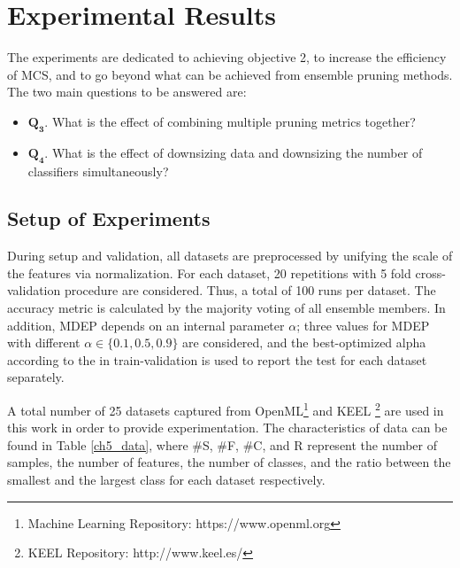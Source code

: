 %
%
\section{Experimental Results}
\label{ch5_expsetup}
The experiments are dedicated to achieving objective 2, to increase the efficiency of MCS, and to go beyond what can be achieved from ensemble pruning methods. The two main questions to be answered are:
\begin{itemize}[nosep]
\setlength{\itemindent}{-.5in}
    \item $\pmb{Q_3}$. What is the effect of combining multiple pruning metrics together? 
    \item $\pmb{Q_4}$. What is the effect of downsizing data and downsizing the number of classifiers simultaneously? 
\end{itemize}

\subsection{Setup of Experiments}
During setup and validation, all datasets are preprocessed by unifying the scale of the features via normalization. For each dataset, 20 repetitions with 5 fold cross-validation procedure are considered. Thus, a total of 100 runs per dataset. The accuracy metric is calculated by the majority voting of all ensemble members. In addition, MDEP depends on an internal parameter $\alpha$; three values for MDEP with different $\alpha \in \{0.1, 0.5,0.9\}$ are considered, and the best-optimized alpha according to the in train-validation is used to report the test for each dataset separately.

A total number of 25 datasets captured from OpenML\footnote{ Machine Learning Repository: https://www.openml.org} and KEEL \footnote{KEEL Repository: http://www.keel.es/} are used in this work in order to provide experimentation. The characteristics of data can be found in Table \ref{ch5_data}, where \#S, \#F, \#C, and R represent the number of samples, the number of features, the number of classes, and the ratio between the smallest and the largest class for each dataset respectively. 


